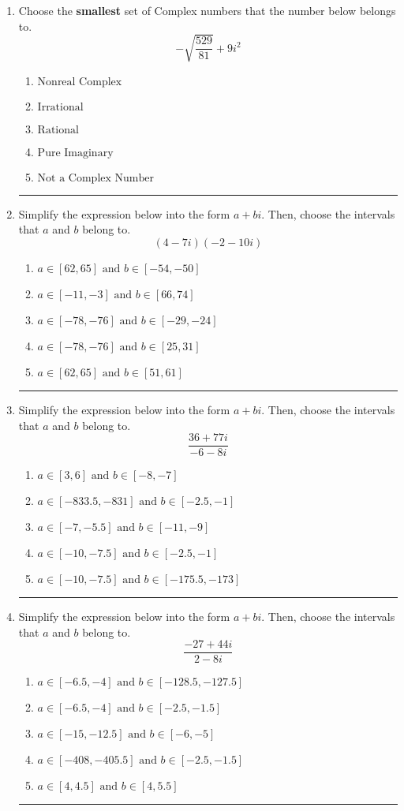 \documentclass[14pt]{extbook}
\newcommand{\litem}[1]{\item#1\hspace*{-1cm}\rule{\textwidth}{0.4pt}}
\begin{document}
\begin{enumerate}
\litem{
Choose the \textbf{smallest} set of Complex numbers that the number below belongs to.\[ -\sqrt{\frac{529}{81}} + 9i^2 \]\begin{enumerate}[label=\Alph*.]
\item \( \text{Nonreal Complex} \)
\item \( \text{Irrational} \)
\item \( \text{Rational} \)
\item \( \text{Pure Imaginary} \)
\item \( \text{Not a Complex Number} \)

\end{enumerate} }
\litem{
Simplify the expression below into the form $a+bi$. Then, choose the intervals that $a$ and $b$ belong to.\[ (4 - 7 i)(-2 - 10 i) \]\begin{enumerate}[label=\Alph*.]
\item \( a \in [62, 65] \text{ and } b \in [-54, -50] \)
\item \( a \in [-11, -3] \text{ and } b \in [66, 74] \)
\item \( a \in [-78, -76] \text{ and } b \in [-29, -24] \)
\item \( a \in [-78, -76] \text{ and } b \in [25, 31] \)
\item \( a \in [62, 65] \text{ and } b \in [51, 61] \)

\end{enumerate} }
\litem{
Simplify the expression below into the form $a+bi$. Then, choose the intervals that $a$ and $b$ belong to.\[ \frac{36 + 77 i}{-6 - 8 i} \]\begin{enumerate}[label=\Alph*.]
\item \( a \in [3, 6] \text{ and } b \in [-8, -7] \)
\item \( a \in [-833.5, -831] \text{ and } b \in [-2.5, -1] \)
\item \( a \in [-7, -5.5] \text{ and } b \in [-11, -9] \)
\item \( a \in [-10, -7.5] \text{ and } b \in [-2.5, -1] \)
\item \( a \in [-10, -7.5] \text{ and } b \in [-175.5, -173] \)

\end{enumerate} }
\litem{
Simplify the expression below into the form $a+bi$. Then, choose the intervals that $a$ and $b$ belong to.\[ \frac{-27 + 44 i}{2 - 8 i} \]\begin{enumerate}[label=\Alph*.]
\item \( a \in [-6.5, -4] \text{ and } b \in [-128.5, -127.5] \)
\item \( a \in [-6.5, -4] \text{ and } b \in [-2.5, -1.5] \)
\item \( a \in [-15, -12.5] \text{ and } b \in [-6, -5] \)
\item \( a \in [-408, -405.5] \text{ and } b \in [-2.5, -1.5] \)
\item \( a \in [4, 4.5] \text{ and } b \in [4, 5.5] \)


\end{enumerate}}
\end{enumerate}
\end{document}
